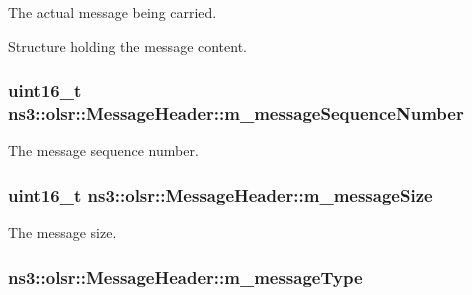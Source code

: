 The actual message being carried. 

Structure holding the message content. 
\subsubsection[{\texorpdfstring{m\+\_\+message\+Sequence\+Number}{m_messageSequenceNumber}}]{\setlength{\rightskip}{0pt plus 5cm}uint16\+\_\+t ns3\+::olsr\+::\+Message\+Header\+::m\+\_\+message\+Sequence\+Number\hspace{0.3cm}{\ttfamily [private]}}\hypertarget{classns3_1_1olsr_1_1MessageHeader_ae953932c7723f0100c01b1b46bb40ea3}{}\label{classns3_1_1olsr_1_1MessageHeader_ae953932c7723f0100c01b1b46bb40ea3}


The message sequence number. 

\subsubsection[{\texorpdfstring{m\+\_\+message\+Size}{m_messageSize}}]{\setlength{\rightskip}{0pt plus 5cm}uint16\+\_\+t ns3\+::olsr\+::\+Message\+Header\+::m\+\_\+message\+Size\hspace{0.3cm}{\ttfamily [private]}}\hypertarget{classns3_1_1olsr_1_1MessageHeader_ad54621c6bec806636834a721bd68bd95}{}\label{classns3_1_1olsr_1_1MessageHeader_ad54621c6bec806636834a721bd68bd95}


The message size. 

\subsubsection[{\texorpdfstring{m\+\_\+message\+Type}{m_messageType}}]{ ns3\+::olsr\+::\+Message\+Header\+::m\+\_\+message\+Type\hspace{0.3cm}{\ttfamily [private]}}\hypertarget{classns3_1_1olsr_1_1MessageHeader_a252a75cd4061df2a1a1b8b4273015ce3}{}\label{classns3_1_1olsr_1_1MessageHeader_a252a75cd4061df2a1a1b8b4273015ce3}


